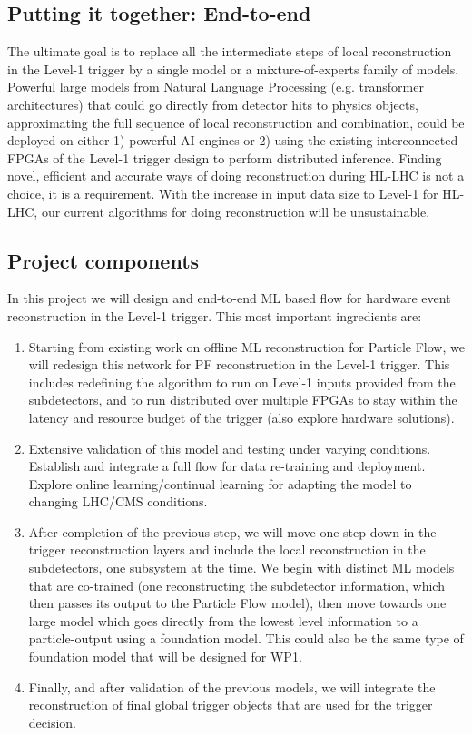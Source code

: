 \documentclass[12pt]{iopart}
\begin{document}
\subsection{Putting it together: End-to-end}
The ultimate goal is to replace all the intermediate steps of local reconstruction in the Level-1 trigger by a single model or a mixture-of-experts family of models. Powerful large models from Natural Language Processing (e.g. transformer architectures) that could go directly from detector hits to physics objects, approximating the full sequence of local reconstruction and combination, could be deployed on either 1) powerful AI engines or 2) using the existing interconnected FPGAs of the Level-1 trigger design to perform distributed inference. Finding novel, efficient and accurate ways of doing reconstruction during HL-LHC is not a choice, it is a requirement. With the increase in input data size to Level-1 for HL-LHC, our current algorithms for doing reconstruction will be unsustainable.

\subsection{Project components}
In this project we will design and end-to-end ML based flow for hardware event reconstruction in the Level-1 trigger. This most important ingredients are:
\begin{enumerate}
    \item Starting from existing work on offline ML reconstruction for Particle Flow, we will redesign this network for PF reconstruction in the Level-1 trigger. This includes redefining the algorithm to run on Level-1 inputs provided from the subdetectors, and to run distributed over multiple FPGAs to stay within the latency and resource budget of the trigger (also explore hardware solutions).
    \item Extensive validation of this model and testing under varying conditions. Establish and integrate a full flow for data re-training and deployment. Explore online learning/continual learning for adapting the model to changing LHC/CMS conditions. 
    \item After completion of the previous step, we will move one step down in the trigger reconstruction layers and include the local reconstruction in the subdetectors, one subsystem at the time. We begin with distinct ML models that are co-trained (one reconstructing the subdetector information, which then passes its output to the Particle Flow model), then move towards one large model which goes directly from the lowest level information to a particle-output using a foundation model. This could also be the same type of foundation model that will be designed for WP1.
    \item Finally, and after validation of the previous models, we will integrate the reconstruction of final global trigger objects that are used for the trigger decision. 
\end{enumerate}
\end{document}
